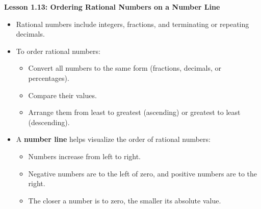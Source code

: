 \begin{center}
\textbf{Lesson 1.13: Ordering Rational Numbers on a Number Line}
\end{center}

\vspace*{-1.5ex}

\begin{itemize}
    \item Rational numbers include integers, fractions, and terminating or repeating decimals.
    \item To order rational numbers:
    \begin{itemize}
        \item Convert all numbers to the same form (fractions, decimals, or percentages).
        \item Compare their values.
        \item Arrange them from least to greatest (ascending) or greatest to least (descending).
    \end{itemize}
    \item A \textbf{number line} helps visualize the order of rational numbers:
    \begin{itemize}
        \item Numbers increase from left to right.
        \item Negative numbers are to the left of zero, and positive numbers are to the right.
        \item The closer a number is to zero, the smaller its absolute value.
    \end{itemize}
\end{itemize}
